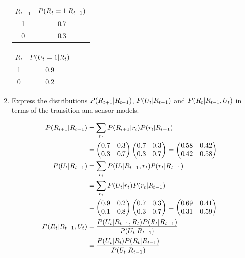 \documentclass[11pt, a4paper]{article}
\begin{document}
\begin{enumerate}
\begin{solution}
        \begin{minipage}{0.495\textwidth}
            \centering
            \begin{tabular}{c|c}
                \toprule
                 $R_{t-1}$ & $P(R_t = 1 \vert R_{t-1})$ \\
                 \midrule
                 1 & 0.7 \\
                 0 & 0.3 \\
                \bottomrule
            \end{tabular}
        \end{minipage}
        \begin{minipage}{0.495\textwidth}
            \centering
            \begin{tabular}{c|c}
                \toprule
                 $R_t$ & $P(U_t = 1 \vert R_t)$ \\
                 \midrule
                 1 & 0.9 \\
                 0 & 0.2 \\
                \bottomrule
            \end{tabular}
        \end{minipage}
        
        \vspace{1ex}
    \end{solution}
    
    \item Express the distributions $P(R_{t + 1} \vert R_{t-1})$, $P(U_t \vert R_{t-1})$ and $P(R_t \vert R_{t-1}, U_t)$ in terms of the transition and sensor models.
    
    \begin{solution}
        \begin{align*}
            P(R_{t + 1} \vert R_{t-1}) & = \sum_{r_t} P(R_{t + 1} \vert r_t) P(r_t \vert R_{t-1}) \\
            & = \begin{pmatrix}0.7 & 0.3 \\ 0.3 & 0.7\end{pmatrix} \begin{pmatrix}0.7 & 0.3 \\ 0.3 & 0.7\end{pmatrix} = \begin{pmatrix}0.58 & 0.42 \\ 0.42 & 0.58\end{pmatrix} \\
            P(U_t \vert R_{t-1}) & = \sum_{r_t} P(U_t \vert R_{t-1}, r_t) P(r_t \vert R_{t-1}) \\
            & = \sum_{r_t} P(U_t \vert r_t) P(r_t \vert R_{t-1}) \\
            & = \begin{pmatrix}0.9 & 0.2 \\ 0.1 & 0.8\end{pmatrix} \begin{pmatrix}0.7 & 0.3 \\ 0.3 & 0.7\end{pmatrix} = \begin{pmatrix}0.69 & 0.41 \\ 0.31 & 0.59\end{pmatrix} \\
            P(R_t \vert R_{t-1}, U_t) & = \frac{P(U_t \vert R_{t-1}, R_t) P(R_t \vert R_{t-1})}{P(U_t \vert R_{t-1})} \\
            & = \frac{P(U_t \vert R_t) P(R_t \vert R_{t-1})}{P(U_t \vert R_{t-1})}
        \end{align*}
    \end{solution}
    

\end{enumerate}
\end{document}
